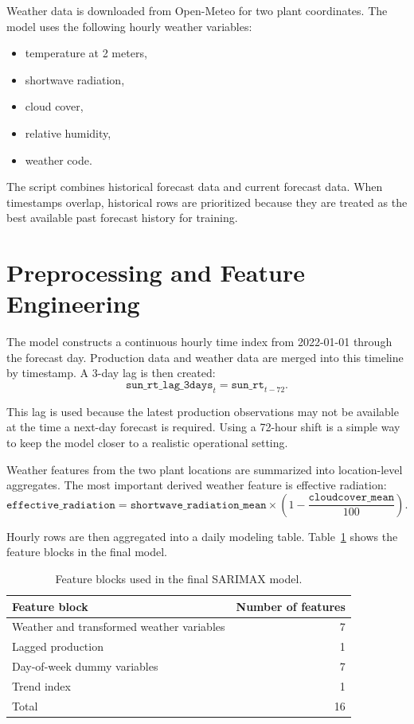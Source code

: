 \documentclass[11pt]{article}
\begin{document}
Weather data is downloaded from Open-Meteo for two plant coordinates. The model
uses the following hourly weather variables:

\begin{itemize}
    \item temperature at 2 meters,
    \item shortwave radiation,
    \item cloud cover,
    \item relative humidity,
    \item weather code.
\end{itemize}

The script combines historical forecast data and current forecast data. When
timestamps overlap, historical rows are prioritized because they are treated as
the best available past forecast history for training.

\section{Preprocessing and Feature Engineering}

The model constructs a continuous hourly time index from 2022-01-01 through the
forecast day. Production data and weather data are merged into this timeline by
timestamp. A 3-day lag is then created:
\[
    \texttt{sun\_rt\_lag\_3days}_t = \texttt{sun\_rt}_{t-72}.
\]

This lag is used because the latest production observations may not be available
at the time a next-day forecast is required. Using a 72-hour shift is a simple
way to keep the model closer to a realistic operational setting.

Weather features from the two plant locations are summarized into location-level
aggregates. The most important derived weather feature is effective radiation:
\[
    \texttt{effective\_radiation}
    =
    \texttt{shortwave\_radiation\_mean}
    \times
    \left(1 - \frac{\texttt{cloudcover\_mean}}{100}\right).
\]

Hourly rows are then aggregated into a daily modeling table. Table~\ref{tab:feature_blocks}
shows the feature blocks in the final model.

\begin{table}[H]
\centering
\caption{Feature blocks used in the final SARIMAX model.}
\label{tab:feature_blocks}
\begin{tabular}{lr}
\toprule
Feature block & Number of features \\
\midrule
Weather and transformed weather variables & 7 \\
Lagged production & 1 \\
Day-of-week dummy variables & 7 \\
Trend index & 1 \\
\midrule
Total & 16 \\
\bottomrule
\end{tabular}
\end{table}
\end{document}
